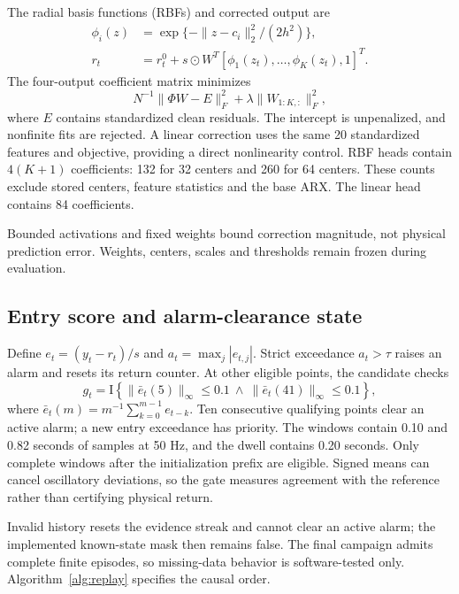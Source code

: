 The radial basis functions (RBFs) and corrected output are
\begin{align}
 \phi_i(z)&=\exp\{-\|z-c_i\|_2^2/(2h^2)\},\\
 r_t&=r_t^0+s\odot W^T[\phi_1(z_t),\ldots,\phi_K(z_t),1]^T.\label{eq:rbf}
\end{align}
The four-output coefficient matrix minimizes
\begin{equation}
 N^{-1}\|\Phi W-E\|_F^2+\lambda\|W_{1:K,:}\|_F^2,\label{eq:fit}
\end{equation}
where $E$ contains standardized clean residuals. The intercept is unpenalized, and nonfinite fits are rejected. A linear correction uses the same 20 standardized features and objective, providing a direct nonlinearity control. RBF heads contain $4(K+1)$ coefficients: 132 for 32 centers and 260 for 64 centers. These counts exclude stored centers, feature statistics and the base ARX. The linear head contains 84 coefficients.

Bounded activations and fixed weights bound correction magnitude, not physical prediction error. Weights, centers, scales and thresholds remain frozen during evaluation.

\subsection{Entry score and alarm-clearance state}
Define $e_t=(y_t-r_t)/s$ and $a_t=\max_j|e_{t,j}|$. Strict exceedance $a_t>\tau$ raises an alarm and resets its return counter. At other eligible points, the candidate checks
\begin{equation}
 g_t=\mathrm I\!\left\{\|\bar e_t(5)\|_\infty\le0.1\ \land\
 \|\bar e_t(41)\|_\infty\le0.1\right\},\label{eq:gate}
\end{equation}
where $\bar e_t(m)=m^{-1}\sum_{k=0}^{m-1}e_{t-k}$. Ten consecutive qualifying points clear an active alarm; a new entry exceedance has priority. The windows contain 0.10 and 0.82 seconds of samples at 50 Hz, and the dwell contains 0.20 seconds. Only complete windows after the initialization prefix are eligible. Signed means can cancel oscillatory deviations, so the gate measures agreement with the reference rather than certifying physical return.

Invalid history resets the evidence streak and cannot clear an active alarm; the implemented known-state mask then remains false. The final campaign admits complete finite episodes, so missing-data behavior is software-tested only. Algorithm~\ref{alg:replay} specifies the causal order.

